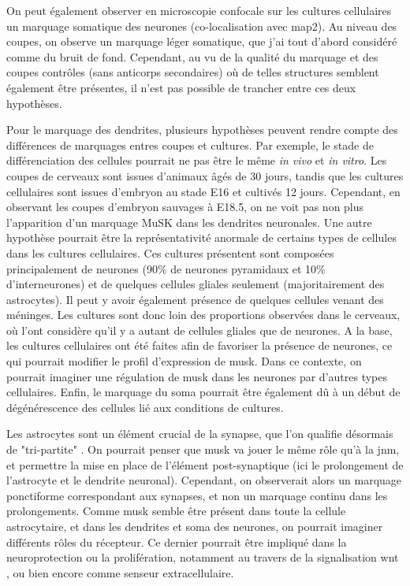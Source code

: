 On peut également observer en microscopie confocale sur les cultures cellulaires un marquage somatique des neurones (co-localisation avec \gls{map2}). Au niveau des coupes, on observe un marquage léger somatique, que j'ai tout d'abord considéré comme du bruit de fond. Cependant, au vu de la qualité du marquage et des coupes contrôles (sans anticorps secondaires) où de telles structures semblent également être présentes, il n'est pas possible de trancher entre ces deux hypothèses.

Pour le marquage des dendrites, plusieurs hypothèses peuvent rendre compte des différences de marquages entres coupes et cultures. Par exemple, le stade de différenciation des cellules pourrait ne pas être le même \emph{in vivo} et \emph{in vitro}. Les coupes de cerveaux sont issues d'animaux âgés de 30 jours, tandis que les cultures cellulaires sont issues d'embryon au stade E16 et cultivés 12 jours. Cependant, en observant les coupes d’embryon sauvages à E18.5, on ne voit pas non plus l’apparition d’un marquage MuSK dans les dendrites neuronales. Une autre hypothèse pourrait être la représentativité anormale de certains types de cellules dans les cultures cellulaires. Ces cultures présentent sont composées principalement de neurones (90\% de neurones pyramidaux et 10\% d'interneurones) et de quelques cellules gliales seulement (majoritairement des astrocytes). Il peut y avoir également présence de quelques cellules venant des méninges. Les cultures sont donc loin des proportions observées dans le cerveaux, où l'ont considère qu'il y a autant de cellules gliales que de neurones. A la base, les cultures cellulaires ont été faites afin de favoriser la présence de neurones, ce qui pourrait modifier le profil d'expression de \gls{musk}. Dans ce contexte, on pourrait imaginer une régulation de \gls{musk} dans les neurones par d'autres types cellulaires. Enfin, le marquage du soma pourrait être également dû à un début de dégénérescence des cellules lié aux conditions de cultures.

Les astrocytes sont un élément crucial de la synapse, que l'on qualifie désormais de "tri-partite" \cite{Araque1999, Perea2009}. On pourrait penser que \gls{musk} va jouer le même rôle qu'à la \gls{jnm}, et permettre la mise en place de l'élément post-synaptique (ici le prolongement de l'astrocyte et le dendrite neuronal). Cependant, on observerait alors un marquage ponctiforme correspondant aux synapses, et non un marquage continu dans les prolongements. Comme \gls{musk} semble être présent dans toute la cellule astrocytaire, et dans les dendrites et soma des neurones, on pourrait imaginer différents rôles du récepteur. Ce dernier pourrait être impliqué dans la neuroprotection ou la prolifération, notamment au travers de la signalisation \Gls{wnt} \cite{Toledo2008, Cerpa2009}, ou bien encore comme senseur extracellulaire.

